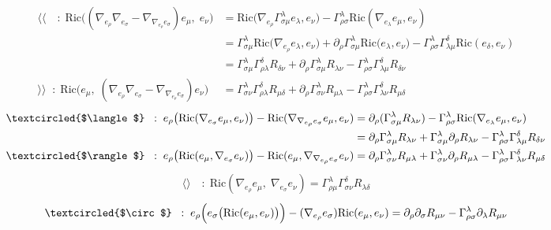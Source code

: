 \documentclass[a4paper,11pt]{article}
\numberwithin{equation}{section}
\theoremstyle{definition}
\newcommand{\R}{{\mathrm{Ric}}}
\begin{document}
\begin{align*}
    \langle\langle \quad:\;
    \R\big((\nabla_{e_\rho}\nabla_{e_\sigma} - \nabla_{\nabla_{e_\rho}e_\sigma})e_\mu,\;e_\nu\big)
    &= \R\big(\nabla_{e_\rho}\Gamma_{\sigma\mu}^\lambda e_\lambda,e_\nu\big) - \Gamma_{\rho\sigma}^\lambda \R(\nabla_{e_\lambda}e_\mu,e_\nu)\\
    &=\Gamma_{\sigma\mu}^\lambda\R\big(\nabla_{e_\rho} e_\lambda,e_\nu\big) + \partial_\rho\Gamma_{\sigma\mu}^\lambda\R\big( e_\lambda,e_\nu\big)- \Gamma_{\rho\sigma}^\lambda \Gamma_{\lambda\mu}^\delta\R(e_\delta,e_\nu)\\
    &=\Gamma_{\sigma\mu}^\lambda\Gamma_{\rho\lambda}^\delta R_{\delta\nu} + \partial_\rho\Gamma_{\sigma\mu}^\lambda R_{\lambda\nu}- \Gamma_{\rho\sigma}^\lambda \Gamma_{\lambda\mu}^\delta R_{\delta\nu}\\
    \rangle\rangle \;\;:\;
    \R\big( e_\mu,\;(\nabla_{e_\rho}\nabla_{e_\sigma} - \nabla_{\nabla_{e_\rho}e_\sigma})e_\nu\big)
    &= \Gamma_{\sigma\nu}^\lambda \Gamma_{\rho\lambda}^\delta R_{\mu\delta} + \partial_\rho  \Gamma_{\sigma\nu}^\lambda R_{\mu\lambda}- \Gamma_{\rho\sigma}^\lambda \Gamma_{\lambda\nu}^\delta R_{\mu\delta}
\end{align*}
\begin{align*}
    \textcircled{$\langle$}\;\;: \; e_\rho\big(\R(\nabla_{e_\sigma} e_\mu, e_\nu)\big) - \R(\nabla_{\nabla_{e_\rho}e_\sigma} e_\mu, e_\nu)
    &= \partial_\rho (\Gamma_{\sigma\mu}^\lambda R_{\lambda\nu}) - \Gamma_{\rho\sigma}^\lambda \R(\nabla_{e_\lambda}e_\mu,e_\nu)\\
    &= \partial_\rho \Gamma_{\sigma\mu}^\lambda R_{\lambda\nu} + \Gamma_{\sigma\mu}^\lambda \partial_\rho R_{\lambda\nu} - \Gamma_{\rho\sigma}^\lambda \Gamma_{\lambda\mu}^\delta R_{\delta\nu}\\
    \textcircled{$\rangle$}\;\;: \; e_\rho\big(\R(e_\mu, \nabla_{e_\sigma} e_\nu)\big) - \R(e_\mu, \nabla_{\nabla_{e_\rho}e_\sigma} e_\nu)
    &= \partial_\rho \Gamma_{\sigma\nu}^\lambda R_{\mu\lambda} + \Gamma_{\sigma\nu}^\lambda \partial_\rho R_{\mu\lambda} - \Gamma_{\rho\sigma}^\lambda \Gamma_{\lambda\nu}^\delta R_{\mu\delta}
\end{align*}
\begin{align*}
\langle\rangle \quad:\;
    \R(\nabla_{e_\rho} e_\mu,\;\nabla_{e_\sigma} e_\nu)
    = \Gamma_{\rho\mu}^\lambda\Gamma_{\sigma\nu}^\delta R_{\lambda\delta}
\end{align*}
\begin{align*}
    \textcircled{$\circ$}\;\;: \; e_\rho\Big(e_\sigma\big(\R(e_\mu, e_\nu)\big)\Big) - (\nabla_{e_\rho}e_\sigma)\R(e_\mu,e_\nu)
    = \partial_\rho\partial_\sigma R_{\mu\nu} - \Gamma_{\rho\sigma}^\lambda \partial_\lambda R_{\mu\nu}
\end{align*}
\end{document}
